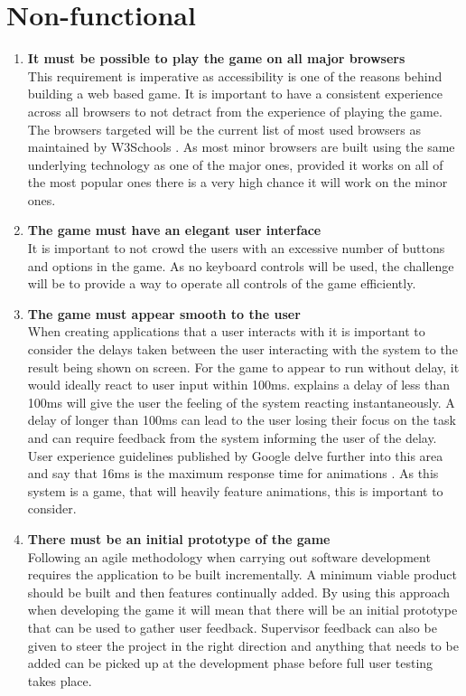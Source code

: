 \documentclass[12pt,a4paper]{report}
\begin{document}
         \section{Non-functional}
   \begin{enumerate}[label*=\arabic*]
            \item \textbf{It must be possible to play the game on all major browsers}\\
            This requirement is imperative as accessibility is one of the reasons behind building a web based game. It is important to have a consistent experience across all browsers to not detract from the experience of playing the game. The browsers targeted will be the current list of most used browsers as maintained by W3Schools \citep{2017}. As most minor browsers are built using the same underlying technology as one of the major ones, provided it works on all of the most popular ones there is a very high chance it will work on the minor ones.    
            
            
                         \item \textbf{The game must have an elegant user interface}\\
It is important to not crowd the users with an excessive number of buttons and options in the game. As no keyboard controls will be used, the challenge will be to provide a way to operate all controls of the game efficiently.
            
                        
                         \item \textbf{The game must appear smooth to the user}\\
When creating applications that a user interacts with it is important to consider the delays taken between the user interacting with the system to the result being shown on screen. For the game to appear to run without delay, it would ideally react to user input within 100ms. \cite{nielsen1994usability} explains a delay of less than 100ms will give the user the feeling of the system reacting instantaneously. A delay of longer than 100ms can lead to the user losing their focus on the task and can require feedback from the system informing the user of the delay. User experience guidelines published by Google delve further into this area and say that 16ms is the maximum response time for animations \citep{kearney_2017}. As this system is a game, that will heavily feature animations, this is important to consider.            
            
             \item \textbf{There must be an initial prototype of the game}\\
            Following an agile methodology when carrying out software development requires the application to be built incrementally. A minimum viable product should be built and then features continually added. By using this approach when developing the game it will mean that there will be an initial prototype that can be used to gather user feedback. Supervisor feedback can also be given to steer the project in the right direction and anything that needs to be added can be picked up at the development phase before full user testing takes place.
            

\end{enumerate}
\end{document}
